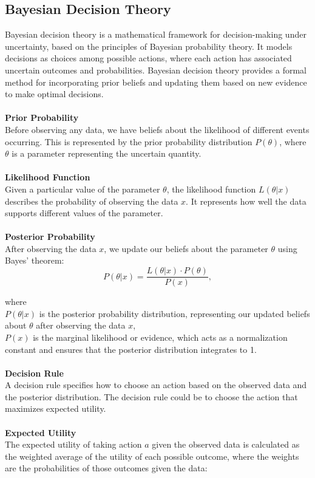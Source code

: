 \documentclass[12pt]{article}
\begin{document}
\subsection{Bayesian Decision Theory}\label{bt}
Bayesian decision theory is a mathematical framework for decision-making
under uncertainty, based on the principles of Bayesian probability theory.
It models decisions as choices among possible actions, where each action
has associated uncertain outcomes and probabilities. Bayesian decision
theory provides a formal method for incorporating prior beliefs and
updating them based on new evidence to make optimal decisions.\\
\\
\textbf{Prior Probability}\\
Before observing any data, we have beliefs about the likelihood of different events
occurring. This is represented by the prior probability
distribution \( P(\theta) \), where \( \theta \) is a parameter representing the uncertain
quantity.\\
\\
\textbf{Likelihood Function}\\
Given a particular value of the parameter \( \theta \), the likelihood
function \( L(\theta | x) \) describes the probability of observing
the data \( x \). It represents how well the data supports different
values of the parameter.\\
\\
\textbf{Posterior Probability}\\
After observing the data \( x \), we update our beliefs about the
parameter \( \theta \) using Bayes' theorem:\\

\begin{equation}
    P(\theta | x) = \frac{L(\theta | x) \cdot P(\theta)}{P(x)},
\end{equation}

\noindent where\\
\( P(\theta | x) \) is the posterior probability distribution, representing our updated beliefs about \( \theta \) after observing the data \( x \),\\
\( P(x) \) is the marginal likelihood or evidence, which acts as a normalization constant and ensures that the posterior distribution integrates to 1.\\
\\
\textbf{Decision Rule}\\
A decision rule specifies how to choose an action based on the observed data and the
posterior distribution. The decision rule could be to choose the action that maximizes
expected utility.\\
\\
\noindent \textbf{Expected Utility}\\
The expected utility of taking action \( a \) given the observed data is calculated
as the weighted average of the utility of each possible outcome, where the weights
are the probabilities of those outcomes given the data:\\
\end{document}
